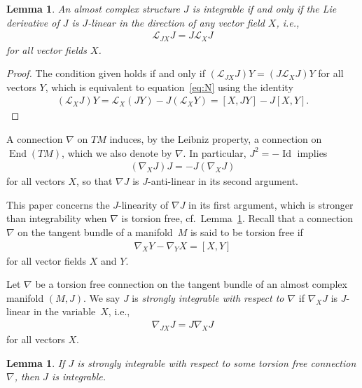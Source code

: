 \documentclass[11pt]{article}
\newtheorem{lem}[thm]{Lemma}
\numberwithin{equation}{section}
\begin{document}
\begin{lem}An almost complex structure $J$ is integrable if and only if the Lie derivative of $J$ is $J$-linear in the direction of any vector field $X$, i.e.,
\begin{gather*}
\mathcal{L}_{JX} J = J \mathcal{L}_{X} J
\end{gather*}
for all vector fields $X$.
\end{lem}

\begin{proof}The condition given holds if and only if $( \mathcal{L}_{JX} J ) Y= ( J \mathcal{L}_{X} J ) Y$ for all vectors $Y$, which is equivalent to equation~\eqref{eq:N} using the identity
\begin{gather*}
( \mathcal{L}_{X} J ) Y = \mathcal{L}_{X} (JY) - J ( \mathcal{L}_{X} Y ) = [X,JY] - J[X,Y].\tag*{\qed}
\end{gather*} \renewcommand{\qed}{}
\end{proof}

A connection $\nabla$ on $TM$ induces, by the Leibniz property, a connection on $\operatorname{End}(TM)$, which we also denote by $\nabla$. In particular, $J^2=-\operatorname{Id}$ implies
\begin{gather*}
( \nabla_X J) J = -J (\nabla_X J)
\end{gather*}
for all vectors $X$, so that $\nabla J$ is $J$-anti-linear in its second argument.

This paper concerns the $J$-linearity of $\nabla J$ in its first argument, which is stronger than integrability when $\nabla$ is torsion free, cf.\ Lemma~\ref{lem;strongimpliesint}. Recall that a connection $\nabla$ on the tangent bundle of a manifold~$M$ is said to be torsion free if
 \begin{gather*}
 \nabla_X Y - \nabla_Y X = [X,Y]
 \end{gather*}
 for all vector fields $X$ and $Y$.

\begin{defn} \label{defn:strongint}
Let $\nabla$ be a torsion free connection on the tangent bundle of an almost complex manifold $(M,J)$. We say $J$ is \emph{strongly integrable with respect to $\nabla$} if $\nabla_X J$ is $J$-linear in the variable~$X$, i.e.,
\begin{gather*}
\nabla_{JX} J = J \nabla_X J
\end{gather*}
for all vectors $X$.
\end{defn}

\begin{lem} \label{lem;strongimpliesint}
If $J$ is strongly integrable with respect to some torsion free connection $\nabla$, then $J$ is integrable.
\end{lem}
\end{document}
